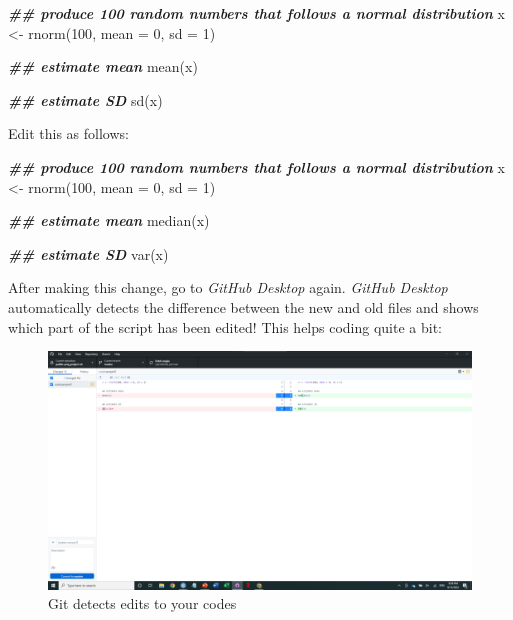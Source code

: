 \documentclass[
]{book}
\newenvironment{Shaded}{\begin{snugshade}}{\end{snugshade}}
\newcommand{\AttributeTok}[1]{\textcolor[rgb]{0.77,0.63,0.00}{#1}}
\newcommand{\DecValTok}[1]{\textcolor[rgb]{0.00,0.00,0.81}{#1}}
\newcommand{\DocumentationTok}[1]{\textcolor[rgb]{0.56,0.35,0.01}{\textbf{\textit{#1}}}}
\newcommand{\FunctionTok}[1]{\textcolor[rgb]{0.00,0.00,0.00}{#1}}
\newcommand{\NormalTok}[1]{#1}
\newcommand{\OtherTok}[1]{\textcolor[rgb]{0.56,0.35,0.01}{#1}}
\begin{document}
\begin{Shaded}
\begin{Highlighting}[]
\DocumentationTok{\#\# produce 100 random numbers that follows a normal distribution}
\NormalTok{x }\OtherTok{\textless{}{-}} \FunctionTok{rnorm}\NormalTok{(}\DecValTok{100}\NormalTok{, }\AttributeTok{mean =} \DecValTok{0}\NormalTok{, }\AttributeTok{sd =} \DecValTok{1}\NormalTok{)}

\DocumentationTok{\#\# estimate mean}
\FunctionTok{mean}\NormalTok{(x)}

\DocumentationTok{\#\# estimate SD}
\FunctionTok{sd}\NormalTok{(x)}
\end{Highlighting}
\end{Shaded}

Edit this as follows:

\begin{Shaded}
\begin{Highlighting}[]
\DocumentationTok{\#\# produce 100 random numbers that follows a normal distribution}
\NormalTok{x }\OtherTok{\textless{}{-}} \FunctionTok{rnorm}\NormalTok{(}\DecValTok{100}\NormalTok{, }\AttributeTok{mean =} \DecValTok{0}\NormalTok{, }\AttributeTok{sd =} \DecValTok{1}\NormalTok{)}

\DocumentationTok{\#\# estimate mean}
\FunctionTok{median}\NormalTok{(x)}

\DocumentationTok{\#\# estimate SD}
\FunctionTok{var}\NormalTok{(x)}
\end{Highlighting}
\end{Shaded}

After making this change, go to \emph{GitHub Desktop} again. \emph{GitHub Desktop} automatically detects the difference between the new and old files and shows which part of the script has been edited! This helps coding quite a bit:

\begin{figure}

{\centering \includegraphics[width=61.11in]{image/git_image06} 

}

\caption{Git detects edits to your codes}\label{fig:gitdesktop5}
\end{figure}
\end{document}
